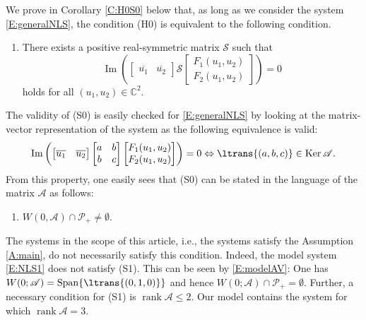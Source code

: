 \documentclass[11pt,a4paper,oneside]{amsart}
\theoremstyle{plain}
\theoremstyle{remark}
\numberwithin{equation}{section}
\newcommand{\C}{\mathbb{C}}
\renewcommand{\Im}{\operatorname{Im}}
\def\({\left(}
\def\){\right)}
\def\le{\leqslant}
\DeclareMathOperator{\rank}{rank}
\DeclareMathOperator{\Ker}{Ker}
\DeclareMathOperator{\Span}{Span}
\theoremstyle{definition}
\begin{document}
We prove in Corollary \ref{C:H0S0} below that, as long as we consider the system \eqref{E:generalNLS}, the condition (H0) is equivalent to the following condition.
\begin{enumerate}
\item[(S0)] 
There exists a positive real-symmetric matrix $\mathscr{S}$ such that
\[
	\Im \(\begin{bmatrix} 
	\overline{u_1} & \overline{u_2} 
	\end{bmatrix}
	\mathscr{S}
	\begin{bmatrix}
	F_1 (u_1,u_2) \\
	F_2 (u_1,u_2)
	\end{bmatrix}
	\)
	=0
\]
holds for all $(u_1,u_2) \in \C^2$.
\end{enumerate}
The validity of (S0)
 is easily checked for \eqref{E:generalNLS}
by looking at the matrix-vector representation of the system as the following equivalence is valid:
\[
	\Im \(\begin{bmatrix} 
	\overline{u_1} & \overline{u_2} 
	\end{bmatrix}
	\begin{bmatrix}
	a & b \\ b & c
	\end{bmatrix}
	\begin{bmatrix}
	F_1 (u_1,u_2) \\
	F_2 (u_1,u_2)
	\end{bmatrix}
	\)
	= 0
	\Leftrightarrow 
\ltrans{(a,b,c)} \in \Ker \mathscr{A}.
\]
From this property, one easily sees that (S0) can be stated in the language of the matrix $\mathscr{A}$ as follows:
\begin{enumerate}
\item[(S1)]
$W(0,\mathscr{A}) \cap \mathcal{P}_+ \neq \emptyset$.
\end{enumerate}
The systems in the scope of this article, i.e., the systems satisfy the Assumption \ref{A:main}, do not necessarily satisfy this condition.
Indeed, the model system \eqref{E:NLS1} does not satisfy (S1).
This can be seen by \eqref{E:modelAV}: One has
$W(0;\mathscr{A}) = \Span\{ \ltrans{(0,1,0)}\}$ and hence $W(0;\mathscr{A})\cap \mathcal{P}_+=\emptyset$.
%
Further, a necessary condition for (S1) is $\rank \mathscr{A}\le 2$. Our model contains the system for which $\rank \mathscr{A}=3$.
\end{document}
